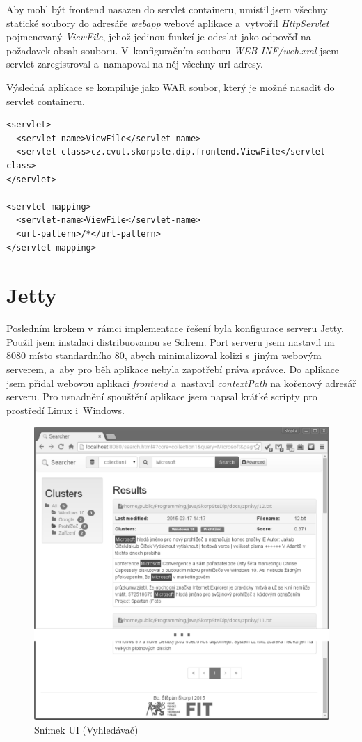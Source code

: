 Aby mohl být frontend nasazen do servlet containeru, umístil jsem všechny statické soubory do adresáře \emph{webapp} webové aplikace a~vytvořil \emph{HttpServlet} pojmenovaný \emph{ViewFile}, jehož jedinou funkcí je odeslat jako odpověď na požadavek obsah souboru. V~konfiguračním souboru \emph{WEB-INF/web.xml} jsem servlet zaregistroval a~namapoval na něj všechny url adresy. 

Výsledná aplikace se kompiluje jako WAR soubor, který je možné nasadit do servlet containeru.

\begin{verbatim}
<servlet>
  <servlet-name>ViewFile</servlet-name>
  <servlet-class>cz.cvut.skorpste.dip.frontend.ViewFile</servlet-class>
</servlet>

<servlet-mapping>
  <servlet-name>ViewFile</servlet-name>
  <url-pattern>/*</url-pattern>
</servlet-mapping>
\end{verbatim}

\section{Jetty}
Posledním krokem v~rámci implementace řešení byla konfigurace serveru Jetty. Použil jsem instalaci distribuovanou se Solrem. Port serveru jsem nastavil na 8080 místo standardního 80, abych minimalizoval kolizi s~jiným webovým serverem, a~aby pro běh aplikace nebyla zapotřebí práva správce. Do aplikace jsem přidal webovou aplikaci \emph{frontend} a~nastavil \emph{contextPath} na kořenový adresář serveru. Pro usnadnění spouštění aplikace jsem napsal krátké scripty pro prostředí Linux i~Windows.

\begin{figure}[h]
\begin{center}
\includegraphics[width=13cm]{ScreenSearcher}
\caption{Snímek UI (Vyhledávač)}
\label{fig:ScreenSearcher}
\end{center}
\end{figure}


